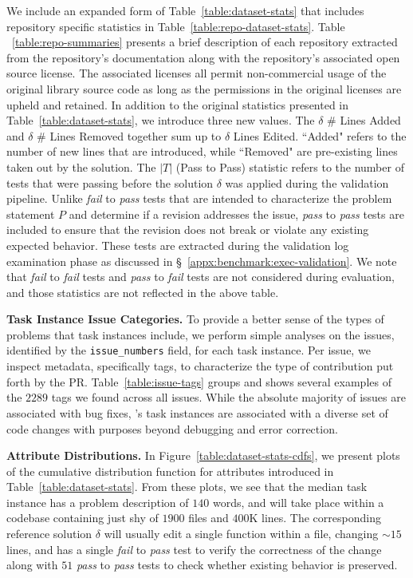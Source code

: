 We include an expanded form of Table~\ref{table:dataset-stats} that includes repository specific statistics in Table~\ref{table:repo-dataset-stats}.
Table ~\ref{table:repo-summaries} presents a brief description of each repository extracted from the repository's documentation along with the repository's associated open source license.
The associated licenses all permit non-commercial usage of the original library source code as long as the permissions in the original licenses are upheld and retained.
In addition to the original statistics presented in Table~\ref{table:dataset-stats}, we introduce three new values.
The $\delta$ \# Lines Added and $\delta$ \# Lines Removed together sum up to $\delta$ Lines Edited. ``Added" refers to the number of new lines that are introduced, while ``Removed" are pre-existing lines taken out by the solution.
The $\vert T \vert$ (Pass to Pass) statistic refers to the number of tests that were passing before the solution $\delta$ was applied during the validation pipeline.
Unlike \textit{fail} to \textit{pass} tests that are intended to characterize the problem statement $P$ and determine if a revision addresses the issue, \textit{pass} to \textit{pass} tests are included to ensure that the revision does not break or violate any existing expected behavior.
These tests are extracted during the validation log examination phase as discussed in \S~\ref{appx:benchmark:exec-validation}.
We note that \textit{fail} to \textit{fail} tests and \textit{pass} to \textit{fail} tests are not considered during evaluation, and those statistics are not reflected in the above table.



\textbf{Task Instance Issue Categories.} To provide a better sense of the types of problems that \benchmark{} task instances include, we perform simple analyses on the issues, identified by the \texttt{issue\_numbers} field, for each task instance.
Per issue, we inspect metadata, specifically tags, to characterize the type of contribution put forth by the PR.
Table~\ref{table:issue-tags} groups and shows several examples of the $\num{2289}$ tags we found across all issues.
While the absolute majority of issues are associated with bug fixes, \benchmark{}'s task instances are associated with a diverse set of code changes with purposes beyond debugging and error correction.



\textbf{Attribute Distributions.} In Figure~\ref{table:dataset-stats-cdfs}, we present plots of the cumulative distribution function for attributes introduced in Table~\ref{table:dataset-stats}.
From these plots, we see that the median \benchmark{} task instance has a problem description of $140$ words, and will take place within a codebase containing just shy of $1900$ files and $400$K lines.
The corresponding reference solution $\delta$ will usually edit a single function within a file, changing $\sim$$15$ lines, and has a single \textit{fail} to \textit{pass} test to verify the correctness of the change along with $51$ \textit{pass} to \textit{pass} tests to check whether existing behavior is preserved.

